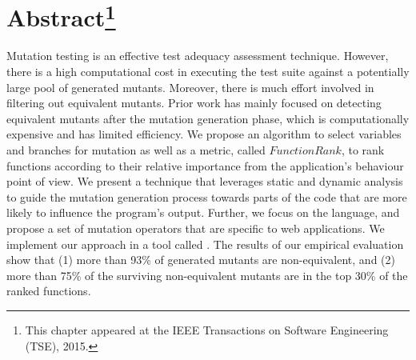 \section*{Abstract\footnote{This chapter appeared at the IEEE Transactions on Software Engineering (TSE), 2015.}}
Mutation testing is an effective test adequacy assessment technique. However, there is a high computational cost in executing the test suite against a potentially large pool of generated mutants. Moreover, there is much effort involved in filtering out equivalent mutants. Prior work has mainly focused on detecting equivalent mutants after the mutation generation phase, which is computationally expensive and has limited efficiency. We propose an algorithm to select variables and branches for mutation as well as a metric, called $FunctionRank$, to rank functions according to their relative importance from the application's behaviour point of view. We present a technique that leverages static and dynamic analysis to guide the mutation generation process towards parts of the code that are more likely to influence the program's output. Further, we focus on the \javascript language, and propose a set of mutation operators that are specific to web applications. We implement our approach in a tool called \mutandis. The results of our empirical evaluation show that 
(1) more than 93\% of generated mutants are non-equivalent, 
and (2) more than 75\% of the surviving non-equivalent mutants
are in the top 30\% of the ranked functions.
